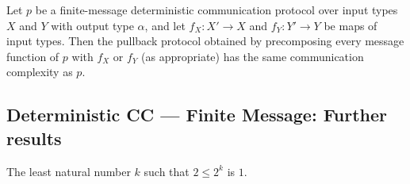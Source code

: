 \begin{theorem}
\label{CommunicationComplexity.Deterministic.FiniteMessage.Protocol.comap_complexity}
\leanok
{}
Let $p$ be a finite-message deterministic communication protocol over input types $X$
and $Y$ with output type $\alpha$, and let $f_X : X' \to X$ and $f_Y : Y' \to Y$ be maps
of input types. Then the pullback protocol obtained by precomposing every message
function of $p$ with $f_X$ or $f_Y$ (as appropriate) has the same communication
complexity as $p$.
\end{theorem}

\subsection*{Deterministic CC --- Finite Message: Further results}

\begin{theorem}
\label{CommunicationComplexity.Deterministic.FiniteMessage.Protocol.clog_two_two}
\leanok
{}
The least natural number $k$ such that $2 \leq 2^k$ is $1$.
\end{theorem}
